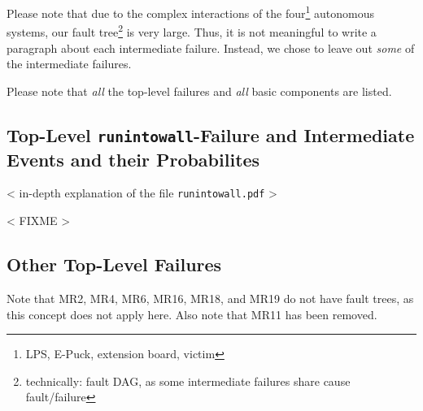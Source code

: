 \documentclass[a4paper,parskip,headheight=38pt]{scrartcl} %
\newcommand{\incomplete}[1]{\textless{} #1 \textgreater{}}
\begin{document}
Please note that due to the complex interactions of the
four\footnote{LPS, E-Puck, extension board, victim} autonomous systems,
our fault tree\footnote{technically: fault DAG, as some intermediate
failures share cause fault/failure} is very large.  Thus, it is not
meaningful to write a paragraph about each intermediate failure.
Instead, we chose to leave out \emph{some} of the intermediate
failures.

Please note that \emph{all} the top-level failures and \emph{all} basic
components are listed.

\subsection*{Top-Level \texttt{runintowall}-Failure and Intermediate Events and their Probabilites}

\incomplete{in-depth explanation of the file \texttt{runintowall.pdf}}

\incomplete{FIXME}


\subsection*{Other Top-Level Failures}

Note that MR2, MR4, MR6, MR16, MR18, and MR19 do
not have fault trees, as this concept does not apply here.  Also note
that MR11 has been removed.
\end{document}
